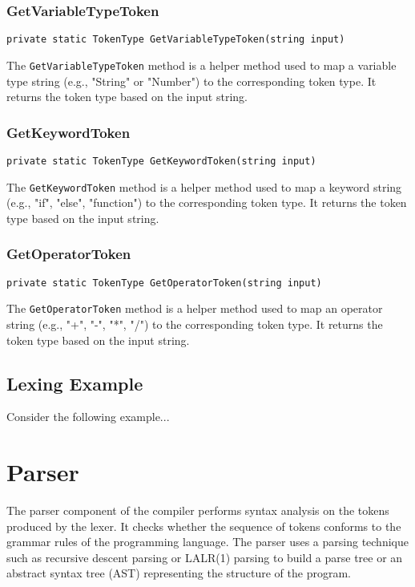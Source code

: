 \documentclass{article}
\begin{document}
\subsubsection{GetVariableTypeToken}
\begin{lstlisting}[language={[Sharp]C}]
private static TokenType GetVariableTypeToken(string input)
\end{lstlisting}
The \texttt{GetVariableTypeToken} method is a helper method used to map a variable type string (e.g., "String" or "Number") to the corresponding token type. It returns the token type based on the input string.

\subsubsection{GetKeywordToken}
\begin{lstlisting}[language={[Sharp]C}]
private static TokenType GetKeywordToken(string input)
\end{lstlisting}
The \texttt{GetKeywordToken} method is a helper method used to map a keyword string (e.g., "if", "else", "function") to the corresponding token type. It returns the token type based on the input string.

\subsubsection{GetOperatorToken}
\begin{lstlisting}[language={[Sharp]C}]
private static TokenType GetOperatorToken(string input)
\end{lstlisting}
The \texttt{GetOperatorToken} method is a helper method used to map an operator string (e.g., "+", "-", "*", "/") to the corresponding token type. It returns the token type based on the input string.

\subsection{Lexing Example}
Consider the following example...

\newpage

\section{Parser}

The parser component of the compiler performs syntax analysis on the tokens produced by the lexer. It checks whether the sequence of tokens conforms to the grammar rules of the programming language. The parser uses a parsing technique such as recursive descent parsing or LALR(1) parsing to build a parse tree or an abstract syntax tree (AST) representing the structure of the program.
\end{document}
